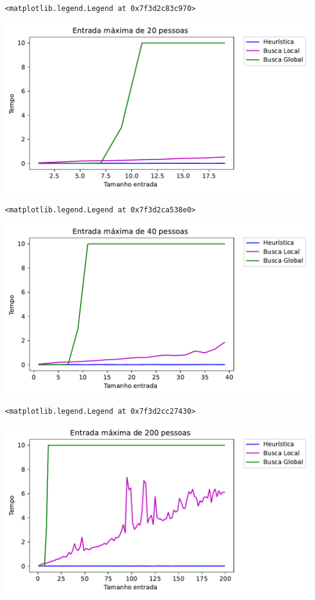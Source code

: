 \documentclass[a4paper,11pt,final]{article}
\begin{document}
\begin{verbatim}
<matplotlib.legend.Legend at 0x7f3d2c83c970>
\end{verbatim}
\includegraphics[width= 15 cm]{figures/teste_figure11_1.pdf}



\begin{verbatim}
<matplotlib.legend.Legend at 0x7f3d2ca538e0>
\end{verbatim}
\includegraphics[width= 15 cm]{figures/teste_figure12_1.pdf}



\begin{verbatim}
<matplotlib.legend.Legend at 0x7f3d2cc27430>
\end{verbatim}
\includegraphics[width= 15 cm]{figures/teste_figure13_1.pdf}
\end{document}
